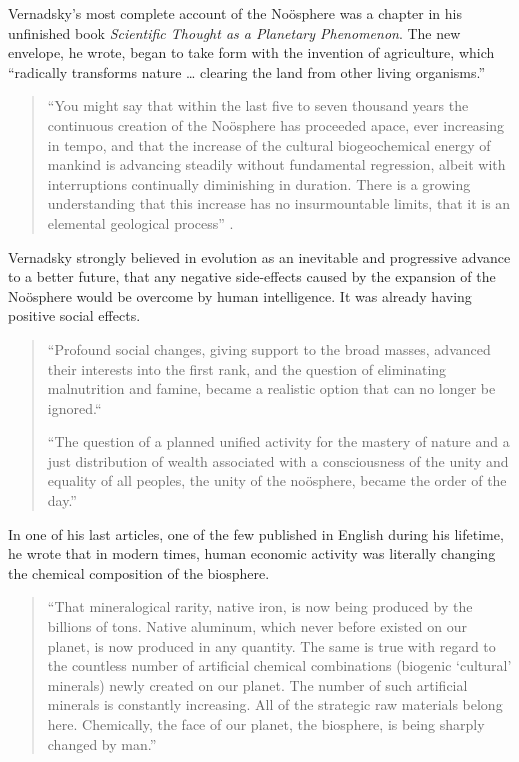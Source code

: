 \documentclass[11pt,a4paper]{article}
\begin{document}
Vernadsky’s most complete account of the Noösphere was a chapter in his
unfinished book \emph{Scientific Thought as a Planetary Phenomenon}. The new
envelope, he wrote, began to take form with the invention of agriculture,
which “radically transforms nature … clearing the land from other living
organisms.”
\begin{quote}  
  “You might say that within the last five to seven thousand years the
  continuous creation of the Noösphere has proceeded apace, ever increasing in
  tempo, and that the increase of the cultural biogeochemical energy of
  mankind is advancing steadily without fundamental regression, albeit with
  interruptions continually diminishing in duration. There is a growing
  understanding that this increase has no insurmountable limits, that it is an
  elemental geological process” \cite[p. 27-28]{19}.
\end{quote}
Vernadsky strongly believed in evolution as an inevitable and progressive
advance to a better future, that any negative side-effects caused by the
expansion of the Noösphere would be overcome by human intelligence. It was
already having positive social effects.
\begin{quote}  
  “Profound social changes, giving support to the broad masses, advanced their
  interests into the first rank, and the question of eliminating malnutrition
  and famine, became a realistic option that can no longer be ignored.“

  “The question of a planned unified activity for the mastery of nature and a
  just distribution of wealth associated with a consciousness of the unity and
  equality of all peoples, the unity of the noösphere, became the order of the
  day.” \cite[p. 30]{19}
\end{quote}
In one of his last articles, one of the few published in English during his
lifetime, he wrote that in modern times, human economic activity was literally
changing the chemical composition of the biosphere.
\begin{quote}  
  “That mineralogical rarity, native iron, is now being produced by the
  billions of tons. Native aluminum, which never before existed on our planet,
  is now produced in any quantity. The same is true with regard to the
  countless number of artificial chemical combinations (biogenic ‘cultural’
  minerals) newly created on our planet. The number of such artificial
  minerals is constantly increasing. All of the strategic raw materials belong
  here. Chemically, the face of our planet, the biosphere, is being sharply
  changed by man.” \cite[p. 9]{21}
\end{quote}
\end{document}
